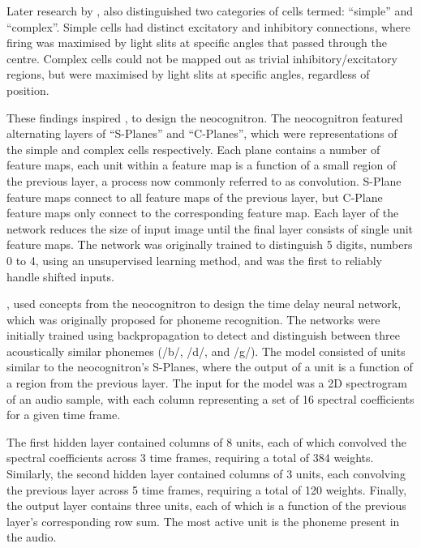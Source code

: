 Later research by \cite{Hubel:1962:Receptive}, also distinguished two categories
of cells termed: ``simple'' and ``complex''.
Simple cells had distinct excitatory and inhibitory connections, where
firing was maximised by light slits at specific angles that passed through the
centre.
Complex cells could not be mapped out as trivial inhibitory/excitatory regions,
but were maximised by light slits at specific angles, regardless of position.



These findings inspired \cite{Fukushima:1980:Neocognitron}, to design the
neocognitron.
The neocognitron featured alternating layers of ``S-Planes'' and ``C-Planes'',
which were representations of the simple and complex cells respectively.
Each plane contains a number of feature maps, each unit within a feature map
is a function of a small region of the previous layer, a process now commonly
referred to as convolution.
S-Plane feature maps connect to all feature maps of the previous layer,
but C-Plane feature maps only connect to the corresponding feature map.
Each layer of the network reduces the size of input image until the final layer
consists of single unit feature maps.
The network was originally trained to distinguish 5 digits, numbers 0 to 4,
using an unsupervised learning method, and was the first to reliably handle
shifted inputs.



\cite{Waibel:1989:Phoneme}, used concepts from the neocognitron to design the
time delay neural network, which was originally proposed for phoneme
recognition.
The networks were initially trained using backpropagation to detect and
distinguish between three acoustically similar phonemes (/b/, /d/, and /g/).
The model consisted of units similar to the neocognitron's S-Planes, where the
output of a unit is a function of a region from the previous layer.
The input for the model was a 2D spectrogram of an audio sample, with each
column representing a set of 16 spectral coefficients for a given time frame.

The first hidden layer contained columns of 8 units, each of which convolved the
spectral coefficients across 3 time frames, requiring a total of 384 weights.
Similarly, the second hidden layer contained columns of 3 units, each convolving
the previous layer across 5 time frames, requiring a total of 120 weights.
Finally, the output layer contains three units, each of which is a function of
the previous layer's corresponding row sum.
The most active unit is the phoneme present in the audio.

